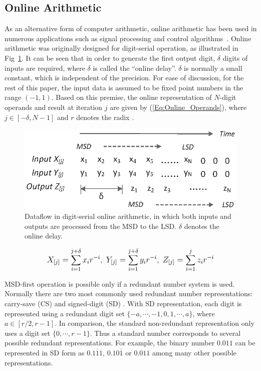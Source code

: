 \documentclass[10pt, conference, compsocconf]{IEEEtran}
\begin{document}
\subsection{Online Arithmetic}

As an alternative form of computer arithmetic, online arithmetic has been used in numerous applications such as signal processing and control algorithms~\cite{Online_FPGADSP,Online_Control}. Online arithmetic was originally designed for digit-serial operation, as illustrated in Fig~\ref{Fig:OnlineDataFlow}. It can be seen that in order to generate the first output digit, $\delta$ digits of inputs are required, where $\delta$ is called the ``online delay''. $\delta$ is normally a small constant, which is independent of the precision. For ease of discussion, for the rest of this paper, the input data is assumed to be fixed point numbers in the range $(-1,1)$. Based on this premise, the online representation of $N$-digit operands and result at iteration $j$ are given by (\ref{Eq:Online_Operands}), where $j\in[-\delta,N-1]$ and $r$ denotes the radix \cite{Ercegovac_Book}.
%
\begin{figure}[tbp]
  \centering
  \includegraphics[width=.42\textwidth]{./figures/OnlineArithmetic_DataFlow.eps}
  \caption{Dataflow in digit-serial online arithmetic, in which both inputs and outputs are processed from the MSD to the LSD. $\delta$ denotes the online delay.}
  \label{Fig:OnlineDataFlow}
\end{figure}
%
\begin{eqnarray}\label{Eq:Online_Operands}
\footnotesize
  X_{[j]}=\sum_{i=1}^{j+\delta}x_ir^{-i},~Y_{[j]}=\sum_{i=1}^{j+\delta}y_ir^{-i},~Z_{[j]}=\sum_{i=1}^{j}z_ir^{-i}
\normalsize
\end{eqnarray}

MSD-first operation is possible only if a redundant number system is used. Normally there are two most commonly used redundant number representations: carry-save (CS) \cite{CSadder} and signed-digit (SD) \cite{RedundantNumber}. With SD representation, each digit is represented using a redundant digit set $\{-a, \cdots,-1,0, 1, \cdots, a\}$, where $a\in[r/2,r-1]$. In comparison, the standard non-redundant representation only uses a digit set $\{0,\cdots,r-1\}$. Thus a standard number corresponds to several possible redundant representations. For example, the binary number $0.011$ can be represented in SD form as $0.1\overline{1}1$, $0.10\overline{1}$ or $0.011$ among many other possible representations.
\end{document}
